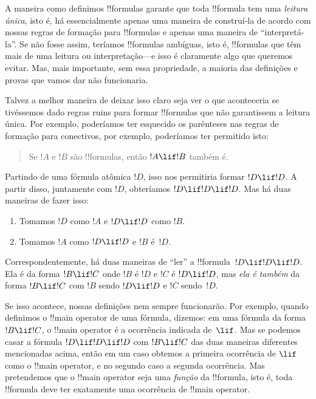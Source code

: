 \documentclass[../../../include/open-logic-section]{subfiles}
\begin{document}


\begin{explain}
A maneira como definimos !!{formula}s garante que toda !!{formula} tem
uma \emph{leitura única}, isto é, há essencialmente apenas uma maneira de
construí-la de acordo com nossas regras de formação para !!{formula}s e
apenas uma maneira de ``interpretá-la''.  Se não fosse assim, teríamos
!!{formula}s ambíguas, isto é, !!{formula}s que têm mais de
uma leitura ou interpretação---e isso é claramente algo que queremos
evitar.  Mas, mais importante, sem essa propriedade, a maioria das
definições e provas que vamos dar não funcionaria.

Talvez a melhor maneira de deixar isso claro seja ver o que aconteceria se
tivéssemos dado regras ruins para formar !!{formula}s que não
garantissem a leitura única.  Por exemplo, poderíamos ter esquecido
os parênteses nas regras de formação para conectivos, por exemplo, poderíamos
ter permitido isto:
\begin{quote}
Se $!A$ e $!B$ são !!{formula}s, então $!A \lif !B$ também é.
\end{quote}
Partindo de uma fórmula atômica $!D$, isso nos permitiria formar $!D
\lif !D$. A partir disso, juntamente com $!D$, obteríamos $!D \lif !D
\lif !D$.  Mas há duas maneiras de fazer isso:
\begin{enumerate}
\item Tomamos $!D$ como $!A$ e $!D \lif !D$ como $!B$.
\item Tomamos $!A$ como $!D \lif !D$ e $!B$ é~$!D$.  
\end{enumerate}
Correspondentemente, há duas maneiras de
``ler'' a !!{formula}~$!D \lif !D \lif !D$. Ela é da forma $!B
\lif !C$ onde $!B$ é $!D$ e $!C$ é $!D \lif !D$, mas \emph{ela é
  também} da forma $!B \lif !C$ com $!B$ sendo $!D \lif !D$ e $!C$
sendo~$!D$.

Se isso acontece, nossas definições nem sempre funcionarão. Por exemplo,
quando definimos o !!{main operator} de uma fórmula, dizemos: em uma
fórmula da forma $!B \lif !C$, o !!{main operator} é a
ocorrência indicada de~$\lif$. Mas se podemos casar a fórmula $!D
\lif !D \lif !D$ com $!B \lif !C$ das duas maneiras diferentes mencionadas
acima, então em um caso obtemos a primeira ocorrência de $\lif$ como o
!!{main operator}, e no segundo caso a segunda ocorrência.  Mas
pretendemos que o !!{main operator} seja uma \emph{função} da
!!{formula}, isto é, toda !!{formula} deve ter exatamente uma ocorrência de
!!{main operator}.
\end{explain}
\end{document}
